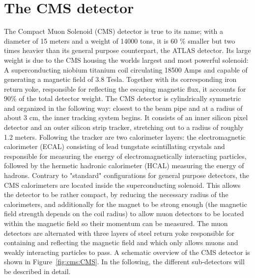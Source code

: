 \section{The CMS detector}

The Compact Muon Solenoid (CMS) detector is true to its name; with a diameter of 15 meters and a weight of 14000 tons, it is 60 \% smaller but two times heavier than its general purpose counterpart, the ATLAS detector.
Its large weight is due to the CMS housing the worlds largest and most powerful solenoid: A superconducting niobium titanium coil circulating 18500 Amps and capable of generating a magnetic field of 3.8 Tesla. Together with its corresponding iron return yoke, responsible for reflecting the escaping magnetic flux, it accounts for 90\% of the total detector weight.
The CMS detector is cylindrically symmetric and organized in the following way: closest to the beam pipe and at a radius of about 3 cm, the inner tracking system begins. It consists of an inner silicon pixel detector and an outer silicon strip tracker, stretching out to a radius of roughly 1.2 meters. Following the tracker are two calorimeter layers: the electromagnetic calorimeter (ECAL) consisting of lead tungstate scintillating crystals and responsible for measuring the energy of electromagnetically interacting particles, followed by the hermetic hadronic calorimeter (HCAL) measuring the energy of hadrons.
Contrary to "standard" configurations for general purpose detectors, the CMS calorimeters are located inside the superconducting solenoid. This allows the detector to be rather compact, by reducing the necessary radius of the calorimeters, and additionally for the magnet to be strong enough (the magnetic field strength depends on the coil radius) to allow muon detectors to be located within the magnetic field so their momentum can be measured.
The muon detectors are alternated with three layers of steel return yoke responsible for containing and reflecting the magnetic field and which only allows muons and weakly interacting particles to pass. A schematic overview of the CMS detector is shown in Figure~\ref{fig:cms:CMS}. In the following, the different sub-detectors will be described in detail.

